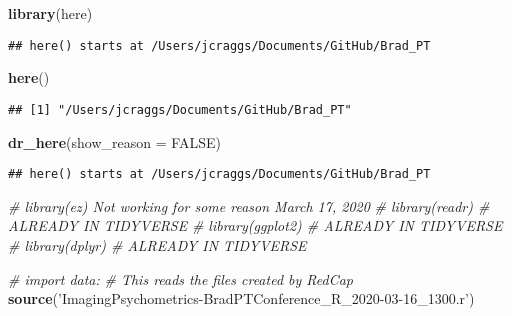 \documentclass[]{article}
\newenvironment{Shaded}{\begin{snugshade}}{\end{snugshade}}
\newcommand{\KeywordTok}[1]{\textcolor[rgb]{0.13,0.29,0.53}{\textbf{#1}}}
\newcommand{\DataTypeTok}[1]{\textcolor[rgb]{0.13,0.29,0.53}{#1}}
\newcommand{\StringTok}[1]{\textcolor[rgb]{0.31,0.60,0.02}{#1}}
\newcommand{\CommentTok}[1]{\textcolor[rgb]{0.56,0.35,0.01}{\textit{#1}}}
\newcommand{\OtherTok}[1]{\textcolor[rgb]{0.56,0.35,0.01}{#1}}
\newcommand{\OperatorTok}[1]{\textcolor[rgb]{0.81,0.36,0.00}{\textbf{#1}}}
\newcommand{\NormalTok}[1]{#1}
\begin{document}
\begin{Shaded}
\begin{Highlighting}[]
\KeywordTok{library}\NormalTok{(here)}
\end{Highlighting}
\end{Shaded}

\begin{verbatim}
## here() starts at /Users/jcraggs/Documents/GitHub/Brad_PT
\end{verbatim}

\begin{Shaded}
\begin{Highlighting}[]
\KeywordTok{here}\NormalTok{()}
\end{Highlighting}
\end{Shaded}

\begin{verbatim}
## [1] "/Users/jcraggs/Documents/GitHub/Brad_PT"
\end{verbatim}

\begin{Shaded}
\begin{Highlighting}[]
\KeywordTok{dr_here}\NormalTok{(}\DataTypeTok{show_reason =} \OtherTok{FALSE}\NormalTok{)}
\end{Highlighting}
\end{Shaded}

\begin{verbatim}
## here() starts at /Users/jcraggs/Documents/GitHub/Brad_PT
\end{verbatim}

\begin{Shaded}
\begin{Highlighting}[]
\CommentTok{# library(ez) Not working for some reason March 17, 2020}
\CommentTok{# library(readr)        # ALREADY IN TIDYVERSE}
\CommentTok{# library(ggplot2)      # ALREADY IN TIDYVERSE}
\CommentTok{# library(dplyr)        # ALREADY IN TIDYVERSE}
\end{Highlighting}
\end{Shaded}

\begin{Shaded}
\begin{Highlighting}[]
\CommentTok{# import data:}
\CommentTok{#   This reads the files created by RedCap}
\KeywordTok{source}\NormalTok{(}\StringTok{'ImagingPsychometrics-BradPTConference_R_2020-03-16_1300.r'}\NormalTok{)}
\end{Highlighting}
\end{Shaded}

\begin{Shaded}
\end{Shaded}
\end{document}
